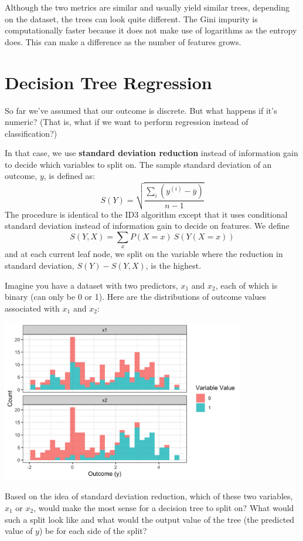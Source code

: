 Although the two metrics are similar and usually yield similar trees, depending on the dataset, the trees can look quite different. The Gini impurity is computationally faster because it does not make use of logarithms as the entropy does. This can make a difference as the number of features grows. 


\section{Decision Tree Regression}

So far we've assumed that our outcome is discrete. But what happens if it's numeric? (That is, what if we want to perform regression instead of classification?)

In that case, we use \textbf{standard deviation reduction} instead of information gain to decide which variables to split on. The sample standard deviation of an outcome, $y$, is defined as:
$$ S(Y) = \sqrt{\frac{\sum_i(y^{(i)} - \overline{y})}{n-1}} $$
The procedure is identical to the ID3 algorithm except that it uses conditional standard deviation instead of information gain to decide on features. We define
$$ S(Y, X) = \sum_{x} P(X = x)~ S(Y(X=x)) $$
and at each current leaf node, we split on the variable where the reduction in standard deviation, $S(Y) - S(Y,X)$, is the highest. 
\vspace{5mm}

\begin{question}{}
Imagine you have a dataset with two predictors, $x_1$ and $x_2$, each of which is binary (can only be 0 or 1). Here are the distributions of outcome values associated with $x_1$ and $x_2$:
\begin{center}
\includegraphics[width=0.8\textwidth]{img/esl-reg-decision-tree-varsplit.png}
\end{center}
Based on the idea of standard deviation reduction, which of these two variables, $x_1$ or $x_2$, would make the most sense for a decision tree to split on? What would such a split look like and what would the output value of the tree (the predicted value of $y$) be for each side of the split?
\end{question}

